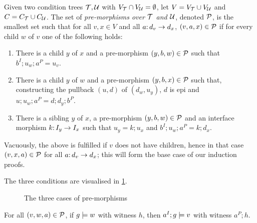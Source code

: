 \medskip\noindent
Given two condition trees ${\mathcal{T}},{\mathcal{U}}$ with $V_{\mathcal{T}}\cap V_{\mathcal{U}}=\emptyset$, let $V=V_{\mathcal{T}}\cup V_{\mathcal{U}}$ and $C=C_{\mathcal{T}}\cup C_{\mathcal{U}}$. The set of \emph{pre-morphisms over ${\mathcal{T}}$ and ${\mathcal{U}}$}, denoted ${\mathcal{P}}$, is the smallest set such that for all $v,x\in V$ and all $a{:}\, d_v\rightarrow d_x$, $(v,a,x)\in {\mathcal{P}}$ if for every child $w$ of $v$ one of the following holds:

\begin{enumerate}[label=\emph{(\roman*)}]
\item There is a child $y$ of $x$ and a pre-morphism $(y,b,w)\in{\mathcal{P}}$ such that $b^I;u_w;a^P=u_v$.
\item There is a child $y$ of $w$ and a pre-morphism $(y,b,x)\in{\mathcal{P}}$ such that, constructing the pullback $(u,d)$ of $(d_w,u_y)$, $d$ is epi and $u;u_w;a^P=d;d_y;b^P$.
\item There is a sibling $y$ of $x$, a pre-morphism $(y,b,w)\in{\mathcal{P}}$ and an interface morphism $k{:}\, I_y\rightarrow I_x$ such that $u_y=k;u_x$ and $b^I;u_w;a^P=k;d_x$.
\end{enumerate}
%
Vacuously, the above is fulfilled if $v$ does not have children, hence in that case $(v,x,a)\in {\mathcal{P}}$ for all $a{:}\, d_v\rightarrow d_x$; this will form the base case of our induction proofs.

The three conditions are visualised in \cref{fig:satisfaction-conditions}.

\begin{figure}

\caption{The three cases of pre-morphisms}
\label{fig:satisfaction-conditions}
\end{figure}

\begin{proposition}
For all $(v,w,a)\in {\mathcal{P}}$, if $g\models w$ with witness $h$, then $a^I;g\models v$ with witness $a^P;h$.
\end{proposition}

